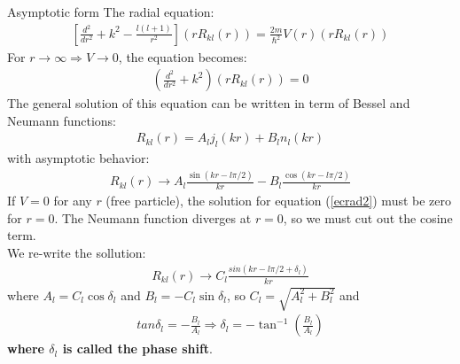 \begin{frame}[allowframebreaks]{Asymptotic form}
The radial equation:
\begin{align}
\left[\frac{d^2}{dr^2}+k^2-\frac{l(l+1)}{r^2}\right](rR_{kl}(r))=\frac{2m}{\hbar^2}V(r)(rR_{kl}(r))
\end{align}
For $r\to\infty \Rightarrow V\to0$, the equation becomes:
\begin{align}
\left(\frac{d^2}{dr^2}+k^2\right)(rR_{kl}(r))=0 \label{ecrad2}
\end{align}
The general solution of this equation can be written in term of Bessel and Neumann functions:
\begin{align}
R_{kl}(r)=A_lj_l(kr)+B_ln_l(kr)
\end{align}
with asymptotic behavior:
\begin{align}
R_{kl}(r) \to A_l \frac{\sin(kr-l\pi/2)}{kr}-B_l\frac{\cos(kr-l\pi/2)}{kr}
\end{align}
If $V=0$ for any $r$ (free particle), the solution for equation (\ref{ecrad2}) must be zero for $r=0$. The Neumann function diverges at $r=0$, so we must cut out the cosine term.\\
We re-write the sollution:
\begin{align}
R_{kl}(r)\to C_l\frac{sin(kr-l\pi/2+\delta_l)}{kr}
\end{align}
where $A_l=C_l\cos\delta_l$ and $B_l=-C_l\sin\delta_l$, so $C_l=\sqrt{A^2_l+B^2_l}$ and
\begin{align}
\boxed{tan\delta_l=-\frac{B_l}{A_l}} \Rightarrow \delta_l=-\tan^{-1}\left(\frac{B_l}{A_l}\right)
\end{align}
{\bf where $\delta_l$ is called the phase shift}.
\end{frame} 

